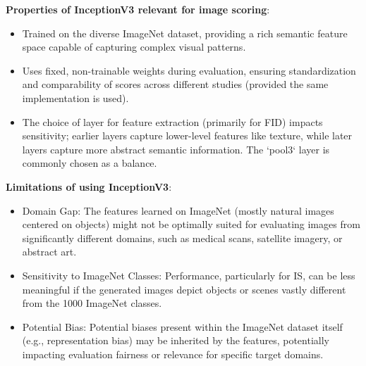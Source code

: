 \noindent\textbf{Properties of InceptionV3 relevant for image scoring}:
\begin{itemize}
    \item Trained on the diverse ImageNet dataset, providing a rich semantic feature space capable of capturing complex visual patterns.
    \item Uses fixed, non-trainable weights during evaluation, ensuring standardization and comparability of scores across different studies (provided the same implementation is used).
    \item The choice of layer for feature extraction (primarily for FID) impacts sensitivity; earlier layers capture lower-level features like texture, while later layers capture more abstract semantic information. The `pool3` layer is commonly chosen as a balance.
\end{itemize}

\noindent\textbf{Limitations of using InceptionV3}:\label{theoretical_inception_model_limitaitions}
\begin{itemize}
    \item Domain Gap: The features learned on ImageNet (mostly natural images centered on objects) might not be optimally suited for evaluating images from significantly different domains, such as medical scans, satellite imagery, or abstract art.
    \item Sensitivity to ImageNet Classes: Performance, particularly for IS, can be less meaningful if the generated images depict objects or scenes vastly different from the 1000 ImageNet classes.
    \item Potential Bias: Potential biases present within the ImageNet dataset itself (e.g., representation bias) may be inherited by the features, potentially impacting evaluation fairness or relevance for specific target domains.
\end{itemize}



\newpage
